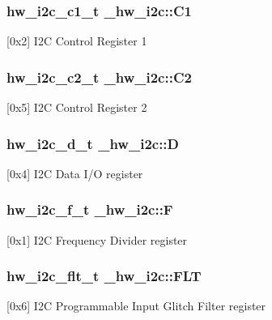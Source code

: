 \subsubsection[{\texorpdfstring{C1}{C1}}]{ {\bf hw\+\_\+i2c\+\_\+c1\+\_\+t} \+\_\+hw\+\_\+i2c\+::\+C1}\hypertarget{struct__hw__i2c_ae967bd38e53acb30b8844a1ca4e82d78}{}\label{struct__hw__i2c_ae967bd38e53acb30b8844a1ca4e82d78}
\mbox{[}0x2\mbox{]} I2C Control Register 1 
\subsubsection[{\texorpdfstring{C2}{C2}}]{ {\bf hw\+\_\+i2c\+\_\+c2\+\_\+t} \+\_\+hw\+\_\+i2c\+::\+C2}\hypertarget{struct__hw__i2c_a1d1143483feaad3f2a52fa0343930f07}{}\label{struct__hw__i2c_a1d1143483feaad3f2a52fa0343930f07}
\mbox{[}0x5\mbox{]} I2C Control Register 2 
\subsubsection[{\texorpdfstring{D}{D}}]{ {\bf hw\+\_\+i2c\+\_\+d\+\_\+t} \+\_\+hw\+\_\+i2c\+::D}\hypertarget{struct__hw__i2c_a9f2803ac724ca66a8215ddb72e9f9d17}{}\label{struct__hw__i2c_a9f2803ac724ca66a8215ddb72e9f9d17}
\mbox{[}0x4\mbox{]} I2C Data I/O register 
\subsubsection[{\texorpdfstring{F}{F}}]{ {\bf hw\+\_\+i2c\+\_\+f\+\_\+t} \+\_\+hw\+\_\+i2c\+::F}\hypertarget{struct__hw__i2c_a7f4be7fb72e226cfe8ffde66c580df05}{}\label{struct__hw__i2c_a7f4be7fb72e226cfe8ffde66c580df05}
\mbox{[}0x1\mbox{]} I2C Frequency Divider register 
\subsubsection[{\texorpdfstring{F\+LT}{FLT}}]{ {\bf hw\+\_\+i2c\+\_\+flt\+\_\+t} \+\_\+hw\+\_\+i2c\+::\+F\+LT}\hypertarget{struct__hw__i2c_ae3d311f13e599552ae58d636adf0bd04}{}\label{struct__hw__i2c_ae3d311f13e599552ae58d636adf0bd04}
\mbox{[}0x6\mbox{]} I2C Programmable Input Glitch Filter register 
